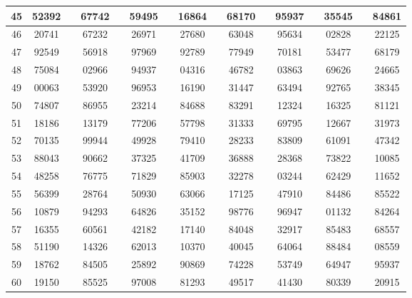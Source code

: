 \begin{center}
\begin{tabular}{cccc cccc cccc cccc}
45 & 52392 & \quad & 67742 & \quad & 59495 & \quad & 16864 & \quad & 68170 & \quad & 95937 & \quad & 35545 & \quad & 84861 \\
\hline
46 & 20741 & \quad & 67232 & \quad & 26971 & \quad & 27680 & \quad & 63048 & \quad & 95634 & \quad & 02828 & \quad & 22125 \\
47 & 92549 & \quad & 56918 & \quad & 97969 & \quad & 92789 & \quad & 77949 & \quad & 70181 & \quad & 53477 & \quad & 68179 \\
48 & 75084 & \quad & 02966 & \quad & 94937 & \quad & 04316 & \quad & 46782 & \quad & 03863 & \quad & 69626 & \quad & 24665 \\
49 & 00063 & \quad & 53920 & \quad & 96953 & \quad & 16190 & \quad & 31447 & \quad & 63494 & \quad & 92765 & \quad & 38345 \\
50 & 74807 & \quad & 86955 & \quad & 23214 & \quad & 84688 & \quad & 83291 & \quad & 12324 & \quad & 16325 & \quad & 81121 \\
\hline
51 & 18186 & \quad & 13179 & \quad & 77206 & \quad & 57798 & \quad & 31333 & \quad & 69795 & \quad & 12667 & \quad & 31973 \\
52 & 70135 & \quad & 99944 & \quad & 49928 & \quad & 79410 & \quad & 28233 & \quad & 83809 & \quad & 61091 & \quad & 47342 \\
53 & 88043 & \quad & 90662 & \quad & 37325 & \quad & 41709 & \quad & 36888 & \quad & 28368 & \quad & 73822 & \quad & 10085 \\
54 & 48258 & \quad & 76775 & \quad & 71829 & \quad & 85903 & \quad & 32278 & \quad & 03244 & \quad & 62429 & \quad & 11652 \\
55 & 56399 & \quad & 28764 & \quad & 50930 & \quad & 63066 & \quad & 17125 & \quad & 47910 & \quad & 84486 & \quad & 85522 \\
\hline
56 & 10879 & \quad & 94293 & \quad & 64826 & \quad & 35152 & \quad & 98776 & \quad & 96947 & \quad & 01132 & \quad & 84264 \\
57 & 16355 & \quad & 60561 & \quad & 42182 & \quad & 17140 & \quad & 84048 & \quad & 32917 & \quad & 85483 & \quad & 68557 \\
58 & 51190 & \quad & 14326 & \quad & 62013 & \quad & 10370 & \quad & 40045 & \quad & 64064 & \quad & 88484 & \quad & 08559 \\
59 & 18762 & \quad & 84505 & \quad & 25892 & \quad & 90869 & \quad & 74228 & \quad & 53749 & \quad & 64947 & \quad & 95937 \\
60 & 19150 & \quad & 85525 & \quad & 97008 & \quad & 81293 & \quad & 49517 & \quad & 41430 & \quad & 80339 & \quad & 20915 \\

\end{tabular}
\end{center}
